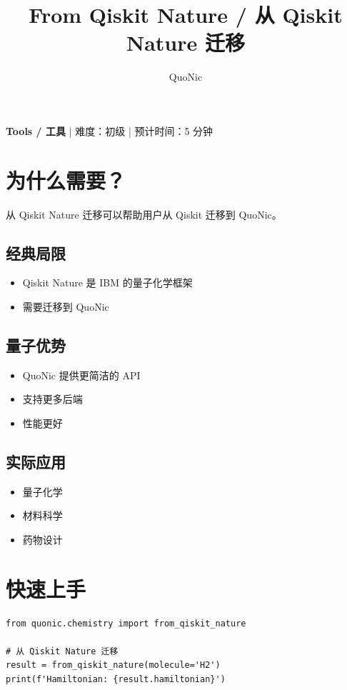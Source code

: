 \documentclass[12pt,a4paper]{article}
\title{From Qiskit Nature / 从 Qiskit Nature 迁移}
\author{QuoNic}
\date{}
\begin{document}
\maketitle

\begin{center}
\textbf{Tools / 工具} | 难度：初级 | 预计时间：5 分钟
\end{center}

\tableofcontents
\newpage

\section{为什么需要？}

从 Qiskit Nature 迁移可以帮助用户从 Qiskit 迁移到 QuoNic。

\subsection{经典局限}
\begin{itemize}
  \item Qiskit Nature 是 IBM 的量子化学框架
  \item 需要迁移到 QuoNic
\end{itemize}

\subsection{量子优势}
\begin{itemize}
  \item QuoNic 提供更简洁的 API
  \item 支持更多后端
  \item 性能更好
\end{itemize}

\subsection{实际应用}
\begin{itemize}
  \item 量子化学
  \item 材料科学
  \item 药物设计
\end{itemize}

\section{快速上手}

\begin{verbatim}
from quonic.chemistry import from_qiskit_nature

# 从 Qiskit Nature 迁移
result = from_qiskit_nature(molecule='H2')
print(f'Hamiltonian: {result.hamiltonian}')
\end{verbatim}
\end{document}
